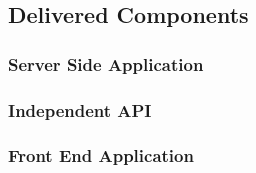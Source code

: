\subsection{Delivered Components}

\subsubsection{Server Side Application}

\subsubsection{Independent API}

\subsubsection{Front End Application}
